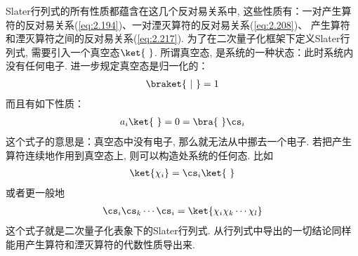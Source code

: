 
Slater行列式的所有性质都蕴含在这几个反对易关系中, 
这些性质有：一对产生算符的反对易关系(\autoref{eq:2.194})、一对湮灭算符的反对易关系(\autoref{eq:2.208})、 产生算符和湮灭算符之间的反对易关系(\autoref{eq:2.217}). 
为了在二次量子化框架下定义Slater行列式, 
需要引入一个真空态$\ket{\,\,}$. 
所谓真空态, 是系统的一种状态：此时系统内没有任何电子. 进一步规定真空态是归一化的：
\begin{align}
\braket{\,\,|\,\,} = 1
\end{align} 
而且有如下性质：
\begin{align}
a_i \ket{\,\,} = 0 = \bra{\,\,} \cs_i
\end{align}
这个式子的意思是：真空态中没有电子, 
那么就无法从中挪去一个电子. 
若把产生算符连续地作用到真空态上, 
则可以构造处系统的任何态. 
比如
\begin{align}
\ket{\chi_i} = \cs_i\ket{\,\,}
\end{align}
或者更一般地
\begin{align}
\cs_i\cs_k\cdots\cs_i = \ket{\chi_i\chi_k\cdots\chi_l}
\end{align}
这个式子就是二次量子化表象下的Slater行列式. 
从行列式中导出的一切结论同样能用产生算符和湮灭算符的代数性质导出来. 


